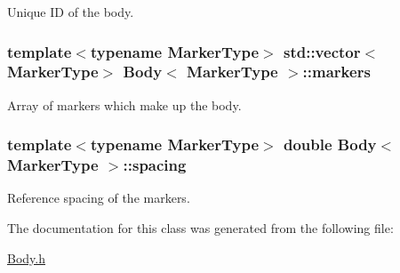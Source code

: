 Unique ID of the body. 

\subsubsection[{\texorpdfstring{markers}{markers}}]{\setlength{\rightskip}{0pt plus 5cm}template$<$typename Marker\+Type$>$ std\+::vector$<$Marker\+Type$>$ {\bf Body}$<$ Marker\+Type $>$\+::markers\hspace{0.3cm}{\ttfamily [protected]}}\hypertarget{class_body_a4e0ac821f2331ec67793a44e36c855e3}{}\label{class_body_a4e0ac821f2331ec67793a44e36c855e3}


Array of markers which make up the body. 

\subsubsection[{\texorpdfstring{spacing}{spacing}}]{\setlength{\rightskip}{0pt plus 5cm}template$<$typename Marker\+Type$>$ double {\bf Body}$<$ Marker\+Type $>$\+::spacing\hspace{0.3cm}{\ttfamily [protected]}}\hypertarget{class_body_a1d4ac2e6fdbc946d5eab0973fd78770b}{}\label{class_body_a1d4ac2e6fdbc946d5eab0973fd78770b}


Reference spacing of the markers. 



The documentation for this class was generated from the following file\+:\begin{DoxyCompactItemize}
\item 
\hyperlink{_body_8h}{Body.\+h}\end{DoxyCompactItemize}
